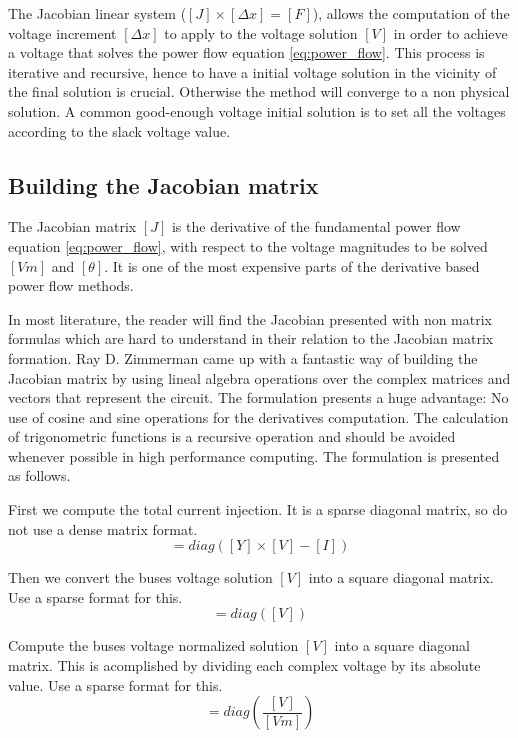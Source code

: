 \documentclass[nols,a4paper,twoside,notoc,fleqn]{tufte-book}
\begin{document}
The Jacobian linear system ($[J] \times [\Delta x] = [F]$), allows the computation of the voltage increment $[\Delta x]$ to apply to the voltage solution $[V]$ in order to achieve a voltage that solves the power flow equation \ref{eq:power_flow}. This process is iterative and recursive, hence to have a initial voltage solution in the vicinity of the final solution is crucial. Otherwise the method will converge to a non physical solution. A common good-enough voltage initial solution is to set all the voltages according to the slack voltage value.


\subsection{Building the Jacobian matrix} \label{Jacobian_chapter}

The Jacobian matrix $[J]$ is the derivative of the fundamental power flow equation \ref{eq:power_flow}, with respect to the voltage magnitudes to be solved $[Vm]$ and $[\theta]$. It is one of the most expensive parts of the derivative based power flow methods.

In most literature, the reader will find the Jacobian presented with non matrix formulas which are hard to understand in their relation to the Jacobian matrix formation. Ray D. Zimmerman came up with a fantastic way of building the Jacobian matrix \cite{zimmerman2010ac} by using lineal algebra operations over the complex matrices and vectors that represent the circuit. The formulation presents a huge advantage: No use of cosine and sine operations for the derivatives computation. The calculation of trigonometric functions is a recursive operation and should be avoided whenever possible in high performance computing. The formulation is presented as follows.

First we compute the total current injection. It is a sparse diagonal matrix, so do not use a dense matrix format.
\begin{equation}
[I_{diag}] = diag([Y] \times [V] - [I])
\end{equation}

Then we convert the buses voltage solution $[V]$ into a square diagonal matrix. Use a sparse format for this.
\begin{equation}
[V_{diag}] = diag([V])
\end{equation}

Compute the buses voltage normalized solution $[V]$ into a square diagonal matrix. This is acomplished by dividing each complex voltage by its absolute value. Use a sparse format for this.
\begin{equation}
[E_{diag}] = diag\left(\frac{[V]}{[Vm]}\right)
\end{equation}
\end{document}

